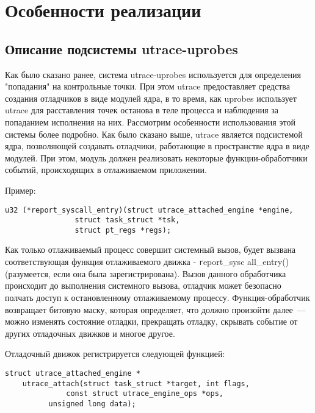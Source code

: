 \section {Особенности реализации} 

\subsection{Описание подсистемы utrace-uprobes}

\bigskip
Как было сказано ранее, система utrace-uprobes используется 
для определения "попадания" на контрольные точки.
При этом utrace предоставляет средства создания 
отладчиков в виде модулей ядра, в то время, как 
uprobes использует utrace для расставления точек 
останова в теле процесса и наблюдения за попаданием 
исполнения на них. 
Рассмотрим особенности использования этой системы 
более подробно.
Как было сказано выше, utrace является подсистемой 
ядра, позволяющей создавать отладчики, работающие в 
пространстве ядра в виде модулей. При этом, модуль 
должен реализовать некоторые функции-обработчики 
событий, происходящих в отлаживаемом приложении. 

Пример:

\bigskip
\begin{lstlisting}
u32 (*report_syscall_entry)(struct utrace_attached_engine *engine,
				struct task_struct *tsk,
				struct pt_regs *regs);

\end{lstlisting}

\bigskip
Как только отлаживаемый процесс совершит системный вызов, будет вызвана 
соответствующая функция отлаживаемого движка - {\texttt report\_sysc
all\_entry()} (разумеется, если она была зарегистрирована). Вызов 
данного обработчика происходит до выполнения системного вызова, 
отладчик может безопасно полчать доступ к остановленному отлаживаемому 
процессу. Функция-обработчик возвращает битовую маску, которая определяет, что 
должно произойти далее~--- можно изменять состояние отладки, 
прекращать отладку, скрывать событие от других отладочных 
движков и многое другое. 

Отладочный движок регистрируется следующей функцией: 
\bigskip
\begin{lstlisting}
struct utrace_attached_engine *
    utrace_attach(struct task_struct *target, int flags,
	      	  const struct utrace_engine_ops *ops, 
		  unsigned long data);
  
\end{lstlisting}

